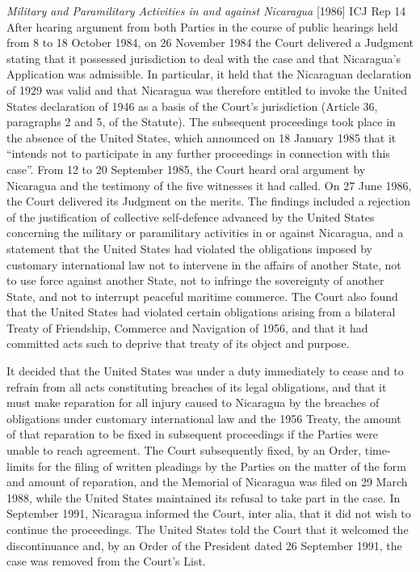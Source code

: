 \begin{casedetails}{\textit{Military and Paramilitary Activities in and against Nicaragua} [1986] ICJ Rep 14}
    After hearing argument from both Parties in the course of public hearings held from 8 to 18 October 1984, on 26 November 1984 the Court delivered a Judgment stating that it possessed jurisdiction to deal with the case and that Nicaragua’s Application was admissible. In particular, it held that the Nicaraguan declaration of 1929 was valid and that Nicaragua was therefore entitled to invoke the United States declaration of 1946 as a basis of the Court's jurisdiction (Article 36, paragraphs 2 and 5, of the Statute). The subsequent proceedings took place in the absence of the United States, which announced on 18 January 1985 that it “intends not to participate in any further proceedings in connection with this case”. From 12 to 20 September 1985, the Court heard oral argument by Nicaragua and the testimony of the five witnesses it had called. On 27 June 1986, the Court delivered its Judgment on the merits. The findings included a rejection of the justification of collective self-defence advanced by the United States concerning the military or paramilitary activities in or against Nicaragua, and a statement that the United States had violated the obligations imposed by customary international law not to intervene in the affairs of another State, not to use force against another State, not to infringe the sovereignty of another State, and not to interrupt peaceful maritime commerce. The Court also found that the United States had violated certain obligations arising from a bilateral Treaty of Friendship, Commerce and Navigation of 1956, and that it had committed acts such to deprive that treaty of its object and purpose.

    \vspace{\baselineskip}
    
    It decided that the United States was under a duty immediately to cease and to refrain from all acts constituting breaches of its legal obligations, and that it must make reparation for all injury caused to Nicaragua by the breaches of obligations under customary international law and the 1956 Treaty, the amount of that reparation to be fixed in subsequent proceedings if the Parties were unable to reach agreement. The Court subsequently fixed, by an Order, time-limits for the filing of written pleadings by the Parties on the matter of the form and amount of reparation, and the Memorial of Nicaragua was filed on 29 March 1988, while the United States maintained its refusal to take part in the case. In September 1991, Nicaragua informed the Court, inter alia, that it did not wish to continue the proceedings. The United States told the Court that it welcomed the discontinuance and, by an Order of the President dated 26 September 1991, the case was removed from the Court's List.


\end{casedetails}
